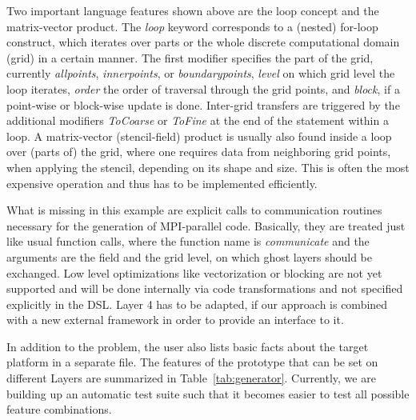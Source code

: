 \documentclass[onecolumn]{svjour3}
\begin{document}
Two important language features shown above are the loop concept and the matrix-vector product. The \textit{loop} keyword corresponds to a (nested) for-loop construct, which iterates over parts or the whole discrete computational domain (grid) in a certain manner. The first modifier specifies the part of the grid, currently \textit{allpoints}, \textit{innerpoints}, or \textit{boundarypoints}, \textit{level} on which grid level the loop iterates, \textit{order} the order of traversal through the grid points, and \textit{block}, if a point-wise or block-wise update is done. Inter-grid transfers are triggered by the additional modifiers \textit{ToCoarse} or \textit{ToFine} at the end of the statement within a loop. A matrix-vector (stencil-field) product is usually also found inside a loop over (parts of) the grid, where one requires data from neighboring grid points, when applying the stencil, depending on its shape and size. This is often the most expensive operation and thus has to be implemented efficiently. 

What is missing in this example are explicit calls to communication routines necessary for the generation of MPI-parallel code. Basically, they are treated just like usual function calls, where the function name is \textit{communicate} and the arguments are the field and the grid level, on which ghost layers should be exchanged. Low level optimizations like vectorization or blocking are not yet supported and will be done internally via code transformations and not specified explicitly in the DSL. Layer 4 has to be adapted, if our approach is combined with a new external framework in order to provide an interface to it. 





In addition to the problem, the user also lists basic facts about the target platform in a separate file.
The features of the prototype that can be set on different Layers are summarized in Table~\ref{tab:generator}. Currently, we are building up an automatic test suite such that it becomes easier to test all possible feature combinations. 
\end{document}
